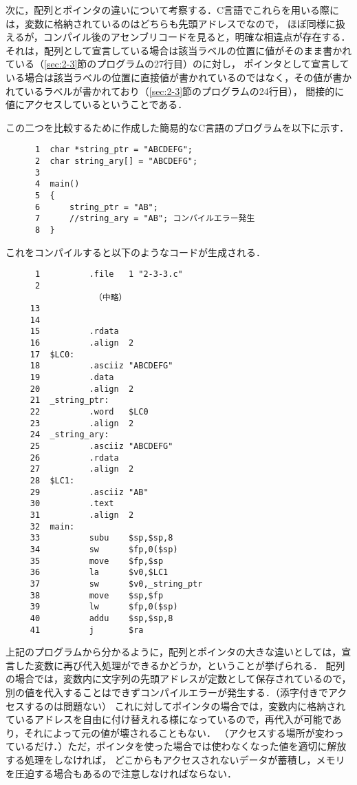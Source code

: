 \documentclass[a4j,11pt]{jarticle}
\begin{document}
次に，配列とポインタの違いについて考察する．C言語でこれらを用いる際には，変数に格納されているのはどちらも先頭アドレスでなので，
ほぼ同様に扱えるが，コンパイル後のアセンブリコードを見ると，明確な相違点が存在する．
それは，配列として宣言している場合は該当ラベルの位置に値がそのまま書かれている（\ref{sec:2-3}節のプログラムの27行目）のに対し，
ポインタとして宣言している場合は該当ラベルの位置に直接値が書かれているのではなく，その値が書かれているラベルが書かれており（\ref{sec:2-3}節のプログラムの24行目），
間接的に値にアクセスしているということである．

この二つを比較するために作成した簡易的なC言語のプログラムを以下に示す．

\begin{verbatim}
      1  char *string_ptr = "ABCDEFG";
      2  char string_ary[] = "ABCDEFG";
      3
      4  main()
      5  {
      6      string_ptr = "AB";
      7      //string_ary = "AB"; コンパイルエラー発生
      8  }
\end{verbatim}

これをコンパイルすると以下のようなコードが生成される．

\begin{verbatim}
      1          .file   1 "2-3-3.c"
      2
                  （中略）
     13
     14
     15          .rdata
     16          .align  2
     17  $LC0:
     18          .asciiz "ABCDEFG"
     19          .data
     20          .align  2
     21  _string_ptr:
     22          .word   $LC0
     23          .align  2
     24  _string_ary:
     25          .asciiz "ABCDEFG"
     26          .rdata
     27          .align  2
     28  $LC1:
     29          .asciiz "AB"
     30          .text
     31          .align  2
     32  main:
     33          subu    $sp,$sp,8
     34          sw      $fp,0($sp)
     35          move    $fp,$sp
     36          la      $v0,$LC1
     37          sw      $v0,_string_ptr
     38          move    $sp,$fp
     39          lw      $fp,0($sp)
     40          addu    $sp,$sp,8
     41          j       $ra
\end{verbatim}

上記のプログラムから分かるように，配列とポインタの大きな違いとしては，宣言した変数に再び代入処理ができるかどうか，ということが挙げられる．
配列の場合では，変数内に文字列の先頭アドレスが定数として保存されているので，別の値を代入することはできずコンパイルエラーが発生する．（添字付きでアクセスするのは問題ない）
これに対してポインタの場合では，変数内に格納されているアドレスを自由に付け替えれる様になっているので，再代入が可能であり，それによって元の値が壊されることもない．
（アクセスする場所が変わっているだけ．）ただ，ポインタを使った場合では使わなくなった値を適切に解放する処理をしなければ，
どこからもアクセスされないデータが蓄積し，メモリを圧迫する場合もあるので注意しなければならない．
\end{document}
